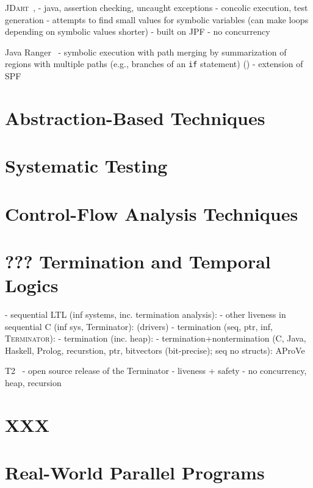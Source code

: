 \textsc{JDart}~\cite{Mues2020}, \cite{Luckow2016}
- java, assertion checking, uncaught exceptions
- concolic execution, test generation
- attempts to find small values for symbolic variables (can make loops depending on symbolic values shorter)
- built on JPF
- no concurrency

Java Ranger~\cite{Sharma2020}
- symbolic execution with path merging by summarization of regions with multiple paths (e.g., branches of an \texttt{if} statement) ()
- extension of SPF

\section{Abstraction-Based Techniques}

\section{Systematic Testing}

\section{Control-Flow Analysis Techniques}

\section{??? Termination and Temporal Logics}

- sequential LTL (inf systems, inc. termination analysis): \cite{Dietsch2015}
- other liveness in sequential C (inf sys, Terminator): \cite{Cook2007} (drivers)
- termination (seq, ptr, inf, \textsc{Terminator}): \cite{Cook2006}
- termination (inc. heap): \cite{Berdine2006}
- termination+nontermination (C, Java, Haskell, Prolog, recurstion, ptr, bitvectors (bit-precise); seq no structs): AProVe \cite{Hensel2017, Giesl2017}

T2~\cite{Brockschmidt2016}
- open source release of the Terminator
- liveness + safety
- no concurrency, heap, recursion

\section{XXX}

\section{Real-World Parallel Programs}


